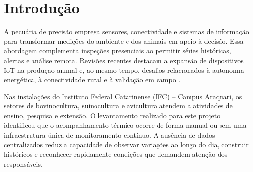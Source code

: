 \documentclass[10pt,a4paper,twocolumn]{article}
\newcommand{\englishkeywords}[1]{\noindent\textbf{Keywords:} #1}
\begin{document}
\begin{abstract}
\noindent
Continuous monitoring of environmental conditions in animal production
facilities can support management, research, and early detection of thermal
discomfort. However, spatially distributed barns and battery-powered devices make
conventional networks difficult to deploy. This paper presents a
LoRaWAN-based Internet of Things infrastructure for monitoring temperature and,
where applicable, relative humidity in cattle, swine, and poultry facilities at
Instituto Federal Catarinense, Araquari Campus. This is an applied, exploratory,
and design-oriented study. Environmental requirements, research on agricultural
LoRa networks, and the technical artifacts produced in a Network Project course
were analyzed. The solution specifies six Dragino LHT65N-DC sensors, a Dragino
LPS8N gateway, \SI{915}{\mega\hertz} communication, managed AWS services, and a
web application. Its data flow covers acquisition, transmission, storage,
historical visualization, and alerts. The proposal combines low-power sensing,
long-range communication, centralized data, separated ingestion and storage
services, identity-based security, and scalability. These qualities can reduce
manual inspections, accelerate responses to thermal deviations, and provide
historical data for management, teaching, and research. Since a complete
physical deployment was not performed,
performance values remain acceptance targets rather than experimental results.

\medskip
\englishkeywords{LoRaWAN; Internet of Things; environmental monitoring; precision livestock farming; sensor networks.}
\end{abstract}

\section{Introdução}

A pecuária de precisão emprega sensores, conectividade e sistemas de informação
para transformar medições do ambiente e dos animais em apoio à decisão. Essa
abordagem complementa inspeções presenciais ao permitir séries históricas,
alertas e análise remota. Revisões recentes destacam a expansão de dispositivos
IoT na produção animal e, ao mesmo tempo, desafios relacionados à autonomia
energética, à conectividade rural e à validação em campo \cite{alves2025}.

Nas instalações do Instituto Federal Catarinense (IFC) -- Campus Araquari, os
setores de bovinocultura, suinocultura e avicultura atendem a atividades de
ensino, pesquisa e extensão. O levantamento realizado para este projeto
identificou que o acompanhamento térmico ocorre de forma manual ou sem uma
infraestrutura única de monitoramento contínuo. A ausência de dados centralizados reduz a capacidade
de observar variações ao longo do dia, construir históricos e reconhecer
rapidamente condições que demandem atenção dos responsáveis.
\end{document}
